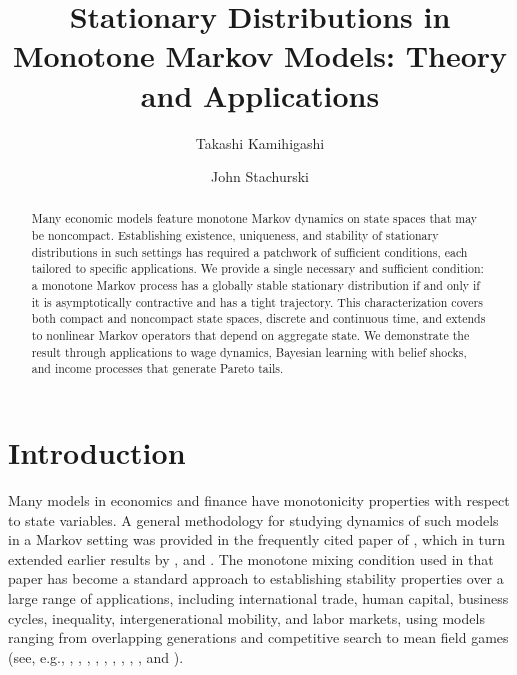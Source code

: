 \documentclass[12pt,reqno]{amsart}
\numberwithin{equation}{section}
\theoremstyle{definition}
\newcommand{\1}{\mathbbm{1}}
\begin{document}
\title[Stationary Distributions in Monotone Markov Models]{Stationary Distributions in Monotone Markov Models: Theory and Applications}

\author{Takashi Kamihigashi}
\address{Center for Computational Social Science, Kobe University}

\author{John Stachurski}
\address{National Graduate Institute for Policy Studies}

\begin{abstract}
Many economic models feature monotone Markov dynamics on state spaces that may
be noncompact. Establishing existence, uniqueness, and stability of stationary
distributions in such settings has required a patchwork of sufficient
conditions, each tailored to specific applications. We provide a single
necessary and sufficient condition: a monotone Markov process 
has a globally stable stationary distribution if and only
if it is asymptotically contractive and has a tight trajectory. This
characterization covers both compact and noncompact state spaces, discrete and
continuous time, and extends to nonlinear Markov operators that depend on
aggregate state.  We demonstrate the result through
applications to wage dynamics, Bayesian learning with belief
shocks, and income processes that generate Pareto tails.
\end{abstract}


\maketitle

\setcounter{page}{1}

\section{Introduction}\label{sec:intro}

Many models in economics and finance have monotonicity properties with respect
to state variables.  A general methodology for studying dynamics of such models
in a Markov setting was provided in the frequently cited paper of
\cite{hopenhayn1992stochastic}, which in turn extended earlier results by
\cite{stokey1989recursive}, and \cite{razin}.  The monotone mixing condition
used in that paper has become a standard approach to establishing stability
properties over a large range of applications, including international trade,
human capital, business cycles, inequality, intergenerational mobility, and
labor markets, using models ranging from overlapping generations and competitive
search to mean field games (see, e.g., \cite{chatterjee2010stochastic},
\cite{hidalgo2009endogenous}, \cite{samaniego2008technical},
\cite{marcet2007incomplete}, \cite{antunes2007startup},
\cite{morand2007stationary}, \cite{le2022managing}, \cite{light2022mean},
\cite{balbus2025markov}, and \cite{kam2025inflation}).
\end{document}
